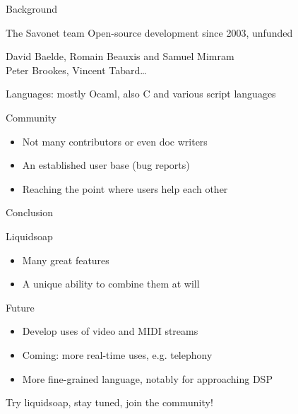 \documentclass{beamer}
\renewcommand{\emph}[1]{\alert{#1}}
\begin{document}

\begin{frame}{Background}

\begin{block}{The Savonet team}
Open-source development since \emph{2003}, unfunded
\begin{center}
David Baelde, Romain Beauxis and Samuel Mimram \\
Peter Brookes, Vincent Tabard\ldots
\end{center}
Languages: mostly \emph{Ocaml}, also C and various script languages
\end{block}

\vfill

\begin{block}{Community}
\begin{itemize}
\item Not many contributors or even doc writers
\item An established user base (bug reports)
\item Reaching the point where users help each other
\end{itemize}
\end{block}

\end{frame}


\begin{frame}{Conclusion}

\begin{block}{Liquidsoap}
\begin{itemize}
\item Many great features
\item A unique ability to combine them at will
\end{itemize}
\end{block}

\begin{block}{Future}
\begin{itemize}
\item Develop uses of video and MIDI streams
\item Coming: more real-time uses, e.g. telephony
\item More fine-grained language, notably for approaching DSP
\end{itemize}
\end{block}

\vfill

\begin{center}
  \large \emph{Try liquidsoap, stay tuned, join the community!}
\end{center}

\end{frame}
\end{document}
